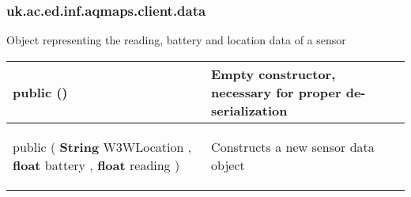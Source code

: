 \subsubsection*{ uk.ac.ed.inf.aqmaps.client.data }
 {\scriptsize Object representing the reading, battery and location data of a sensor
 
\vspace*{-5pt} 
\begin{tabularx}{\linewidth}{m{}|m{}}
\label{tab:SensorData}
\begin{raggedleft}public  \textbf{\hyperref[tab:SensorData]{\color{blue}{SensorData}}}()
\end{raggedleft} &
 Empty constructor, necessary for proper de{-}serialization\\ \hline 
\begin{raggedleft}public  \textbf{\hyperref[tab:SensorData]{\color{blue}{SensorData}} }(\newline \hfill 
\hspace*{ 5pt} \textbf{String} W3WLocation , \newline
 \hspace*{ 5pt} \textbf{float} battery , \newline
 \hspace*{ 5pt} \textbf{float} reading  )
\end{raggedleft} &
 Constructs a new sensor data object\\\end{tabularx}
}
